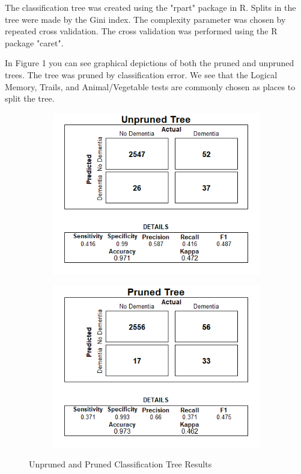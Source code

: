 \documentclass[a4paper,man,natbib,11pt]{article}
\begin{document}
The classification tree was created using the "rpart" package in R. Splits in the tree were made by the Gini index. The complexity parameter was chosen by repeated cross validation. The cross validation was performed using the R package "caret".

In Figure 1 you can see graphical depictions of both the pruned and unpruned trees. The tree was pruned by classification error. We see that the Logical Memory, Trails, and Animal/Vegetable tests are commonly chosen as places to split the tree.

\begin{figure}
\centering
\begin{subfigure}{.5\textwidth}
  \centering
  \includegraphics[width=\linewidth]{unpruned_confusion.png}
\end{subfigure}%
\begin{subfigure}{.5\textwidth}
  \centering
  \includegraphics[width=\linewidth]{pruned_confusion.png}
\end{subfigure}
\caption{Unpruned and Pruned Classification Tree Results}
\label{fig:test}
\end{figure}
\end{document}
